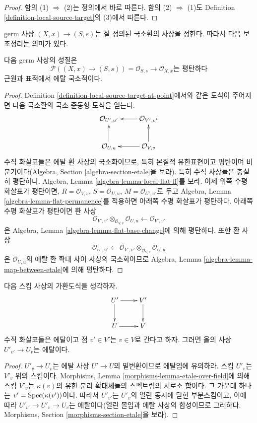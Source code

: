 \begin{proof}
함의 (1) $\Rightarrow$ (2)는 정의에서 바로 따른다. 함의
(2) $\Rightarrow$ (1)도 Definition
\ref{definition-local-source-target}의 (3)에서 따른다.
\end{proof}

\noindent
germ 사상 $(X, x) \to (S, s)$는 잘 정의된 국소환의 사상을 정한다.
따라서 다음 보조정리는 의미가 있다.

\begin{lemma}
\label{lemma-flat-at-point}
다음 germ 사상의 성질은
$$
\mathcal{P}((X, x) \to (S, s)) =
\mathcal{O}_{S, s} \to \mathcal{O}_{X, x}\text{는 평탄하다}
$$
근원과 표적에서 에탈 국소적이다.
\end{lemma}

\begin{proof}
Definition \ref{definition-local-source-target-at-point}에서와 같은
도식이 주어지면 다음 국소환의 국소 준동형 도식을 얻는다.
$$
\xymatrix{
\mathcal{O}_{U', u'} & \mathcal{O}_{V', v'} \ar[l] \\
\mathcal{O}_{U, u} \ar[u] & \mathcal{O}_{V, v} \ar[l] \ar[u]
}
$$
수직 화살표들은 에탈 환 사상의 국소화이므로, 특히 본질적
유한표현이고 평탄이며 비분기이다(Algebra, Section
\ref{algebra-section-etale}을 보라). 특히 수직 사상들은 충실히
평탄하다. Algebra, Lemma \ref{algebra-lemma-local-flat-ff}를 보라.
이제 위쪽 수평 화살표가 평탄이면, $R = \mathcal{O}_{V, v}$,
$S = \mathcal{O}_{U, u}$, $M = \mathcal{O}_{U', u'}$로 두고 Algebra,
Lemma \ref{algebra-lemma-flat-permanence}를 적용하면 아래쪽 수평
화살표가 평탄하다. 아래쪽 수평 화살표가 평탄이면 환 사상
$$
\mathcal{O}_{V', v'} \otimes_{\mathcal{O}_{V, v}} \mathcal{O}_{U, u}
\longleftarrow
\mathcal{O}_{V', v'}
$$
은 Algebra, Lemma \ref{algebra-lemma-flat-base-change}에 의해 평탄하다.
또한 환 사상
$$
\mathcal{O}_{U', u'}
\longleftarrow
\mathcal{O}_{V', v'} \otimes_{\mathcal{O}_{V, v}} \mathcal{O}_{U, u}
$$
은 $\mathcal{O}_{U, u}$의 에탈 환 확대 사이 사상의 국소화이므로
Algebra, Lemma \ref{algebra-lemma-map-between-etale}에 의해 평탄하다.
\end{proof}

\begin{lemma}
\label{lemma-etale-on-fiber}
다음 스킴 사상의 가환도식을 생각하자.
$$
\xymatrix{
U' \ar[r] \ar[d] & V' \ar[d] \\
U \ar[r] & V
}
$$
수직 화살표들은 에탈이고 점 $v' \in V'$는 $v \in V$로 간다고 하자.
그러면 올의 사상 $U'_{v'} \to U_v$는 에탈이다.
\end{lemma}

\begin{proof}
$U'_v \to U_v$는 에탈 사상 $U' \to U$의 밑변환이므로 에탈임에
유의하라. 스킴 $U'_v$는 $V'_v$ 위의 스킴이다. Morphisms, Lemma
\ref{morphisms-lemma-etale-over-field}에 의해 스킴 $V'_v$는
$\kappa(v)$의 유한 분리 확대체들의 스펙트럼의 서로소 합이다.
그 가운데 하나는 $v' = \mathop{\mathrm{Spec}}(\kappa(v'))$이다. 따라서 $U'_{v'}$는
$U'_v$의 열린 동시에 닫힌 부분스킴이고, 이에 따라
$U'_{v'} \to U'_v \to U_v$는 에탈이다(열린 몰입과 에탈 사상의
합성이므로 그러하다. Morphisms, Section
\ref{morphisms-section-etale}을 보라).
\end{proof}

